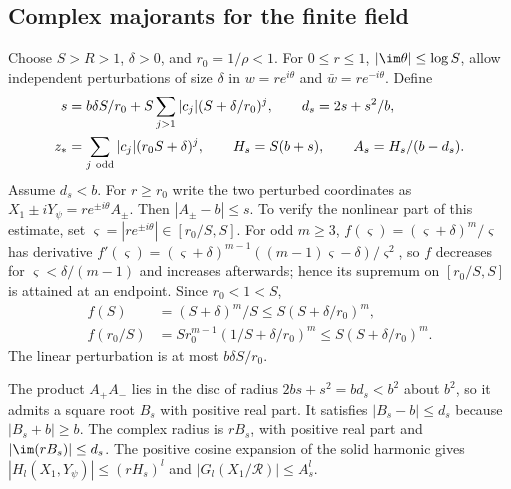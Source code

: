 \subsection{Complex majorants for the finite field}\label{gd:sec:strip}
Choose $S>R>1$, $\delta>0$, and $r_0=1/\rho<1$.
For $0\le r\le1$, $|\im\theta|\le\log S$, allow independent
perturbations of size $\delta$ in $w=re^{i\theta}$ and
$\bar w=re^{-i\theta}$. Define
\begin{equation}\label{gd:eq:strip-parameters}
 \begin{split}
 s&=b\delta S/r_0+
       S\sum_{j>1}|c_j|(S+\delta/r_0)^j,\qquad d_s=2s+s^2/b,\\
 z_*&=\sum_{j\ {\rm odd}}|c_j|(r_0S+\delta)^j,\qquad
 H_s=S(b+s),\qquad A_s=H_s/(b-d_s).
 \end{split}
\end{equation}
Assume $d_s<b$.
For $r\ge r_0$ write the two perturbed coordinates as
$X_1\pm iY_\psi=re^{\pm i\theta}A_\pm$.
Then $|A_\pm-b|\le s$.
To verify the nonlinear part of this estimate, set
$\varsigma=|re^{\pm i\theta}|\in[r_0/S,S]$.
For odd $m\ge3$, $f(\varsigma)=(\varsigma+\delta)^m/\varsigma$ has derivative
$f'(\varsigma)=(\varsigma+\delta)^{m-1}((m-1)\varsigma-\delta)/\varsigma^2$, so $f$ decreases for
$\varsigma<\delta/(m-1)$ and increases afterwards; hence its supremum
on $[r_0/S,S]$ is attained at an endpoint. Since $r_0<1<S$,
\[
 \begin{split}
 f(S)&=(S+\delta)^m/S\le S(S+\delta/r_0)^m,\\
 f(r_0/S)&=Sr_0^{m-1}(1/S+\delta/r_0)^m
                       \le S(S+\delta/r_0)^m.
 \end{split}
\]
The linear perturbation is at most $b\delta S/r_0$.

The product $A_+A_-$ lies in the disc of radius $2bs+s^2=bd_s<b^2$
about $b^2$, so it admits a square root $B_s$ with positive real part.
It satisfies $|B_s-b|\le d_s$ because $|B_s+b|\ge b$.
The complex radius is $rB_s$, with positive real part
and $|\im(rB_s)|\le d_s$.
The positive cosine expansion of the solid harmonic gives
$|H_l(X_1,Y_\psi)|\le(rH_s)^l$ and
$|G_l(X_1/\mathcal R)|\le A_s^l$.


